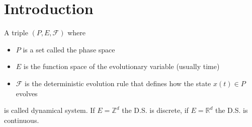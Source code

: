 
\section{Introduction}


\begin{framed}
\begin{definition}
A triple $(P,E,\mathcal{F})$ where
\begin{itemize}[itemsep=3pt, topsep=3pt]
    \item $P$ is a set called the phase space
    \item $E$ is the function space of the evolutionary variable (usually time)
    \item $\mathcal{F}$ is the deterministic evolution rule that defines how the state $x(t)\in P$ evolves
\end{itemize}
is called dynamical system. If $E=\mathbb{Z}^d$ the D.S. is discrete, if $E=\mathbb{R}^d$ the D.S. is continuous.
\end{definition}
\end{framed}


